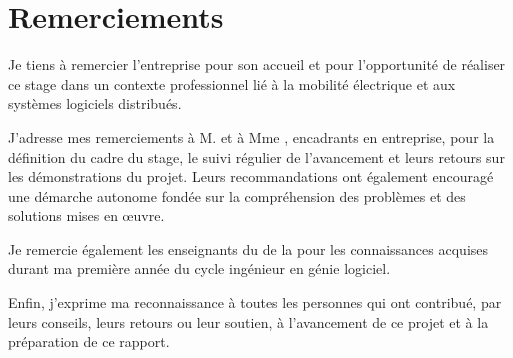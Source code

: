\chapter*{Remerciements}

Je tiens à remercier l'entreprise \CompanyName{} pour son accueil et pour l'opportunité
de réaliser ce stage dans un contexte professionnel lié à la mobilité électrique et aux
systèmes logiciels distribués.

J'adresse mes remerciements à M. \CompanySupervisor{} et à Mme \CompanyCoSupervisor{},
encadrants en entreprise, pour la définition du cadre du stage, le suivi régulier de
l'avancement et leurs retours sur les démonstrations du projet. Leurs recommandations
ont également encouragé une démarche autonome fondée sur la compréhension des problèmes
et des solutions mises en œuvre.

Je remercie également les enseignants du \DepartmentName{} de la \FacultyName{} pour les
connaissances acquises durant ma première année du cycle ingénieur en génie logiciel.

Enfin, j'exprime ma reconnaissance à toutes les personnes qui ont contribué, par leurs
conseils, leurs retours ou leur soutien, à l'avancement de ce projet et à la préparation
de ce rapport.
